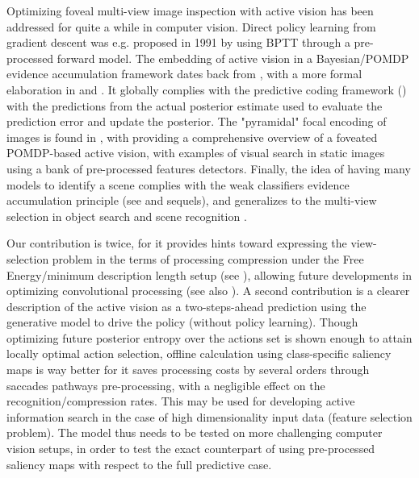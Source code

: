 \documentclass{article}
\begin{document}
Optimizing foveal multi-view image inspection with active vision has been addressed for quite a while in computer vision. Direct policy learning from gradient descent was e.g. proposed in 1991 by \cite{schmidhuber1991learning} using BPTT through a pre-processed forward model.  The embedding of active vision in a Bayesian/POMDP evidence accumulation framework dates back from \cite{bajcsy1988active}, with a more formal elaboration in \cite{najemnik2005optimal} and \cite{butko2010infomax}. It globally complies with the predictive coding framework (\cite{rao1999predictive}) with the predictions from the actual posterior estimate used to evaluate the prediction error and update the posterior. The "pyramidal" focal encoding of images is found in \cite{kortum1996implementation,wang2003foveation}, with
\cite{butko2010infomax} providing a comprehensive overview of a foveated POMDP-based active vision, with examples of visual search in static images using a bank of pre-processed features detectors. Finally, the idea of having many models to identify a scene complies with the weak classifiers evidence accumulation principle (see \cite{viola2003fast} and sequels), and generalizes to the multi-view selection in object search and scene recognition \cite{potthast2016active}.

Our contribution is twice, for it provides hints toward expressing the view-selection problem in the terms of processing compression under the Free Energy/minimum description length setup (see \cite{hinton1994autoencoders}), allowing future developments in optimizing convolutional processing (see also \cite{louizos2017bayesian}). A second contribution is a clearer description of the active vision as a two-steps-ahead prediction using the generative model to drive the policy (without policy learning). Though optimizing future posterior entropy over the actions set is shown enough to attain locally optimal action selection, offline calculation using class-specific saliency maps is way better for it saves processing costs by several orders through saccades pathways pre-processing, with a negligible effect on the recognition/compression rates.    
This may be used for developing active information search in the case of high dimensionality input data (feature selection problem).
The model thus needs to be tested on more challenging computer vision setups, in order to test the exact counterpart of using pre-processed saliency maps with respect to the full predictive case.



\end{document}
